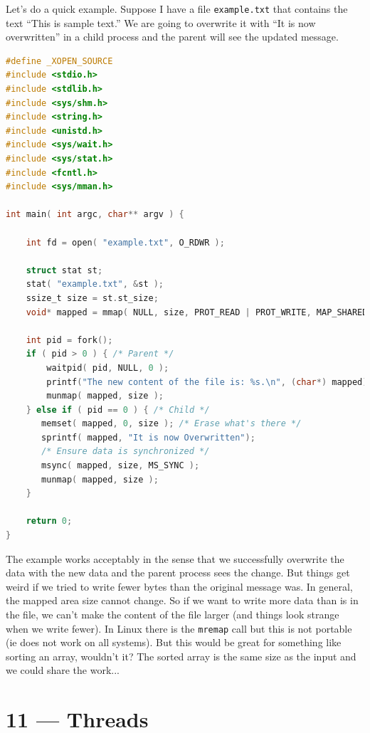 \documentclass[a4paper]{report}
\begin{document}
Let's do a quick example. Suppose I have a file \texttt{example.txt} that contains the text ``This is sample text.'' We are going to overwrite it with ``It is now overwritten'' in a child process and the parent will see the updated message.

\begin{lstlisting}[language=C]
#define _XOPEN_SOURCE
#include <stdio.h>
#include <stdlib.h>
#include <sys/shm.h>
#include <string.h>
#include <unistd.h>
#include <sys/wait.h>
#include <sys/stat.h>
#include <fcntl.h>
#include <sys/mman.h>

int main( int argc, char** argv ) { 

    int fd = open( "example.txt", O_RDWR );
    
    struct stat st; 
    stat( "example.txt", &st );
    ssize_t size = st.st_size;
    void* mapped = mmap( NULL, size, PROT_READ | PROT_WRITE, MAP_SHARED, fd, 0 );  
    
    int pid = fork();
    if ( pid > 0 ) { /* Parent */
        waitpid( pid, NULL, 0 );
        printf("The new content of the file is: %s.\n", (char*) mapped);
        munmap( mapped, size );
    } else if ( pid == 0 ) { /* Child */
       memset( mapped, 0, size ); /* Erase what's there */
       sprintf( mapped, "It is now Overwritten");
       /* Ensure data is synchronized */
       msync( mapped, size, MS_SYNC );
       munmap( mapped, size );
    }

    return 0;
}
\end{lstlisting}

The example works acceptably in the sense that we successfully overwrite the data with the new data and the parent process sees the change. But things get weird if we tried to write fewer bytes than the original message was. In general, the mapped area size cannot change. So if we want to write more data than is in the file, we can't make the content of the file larger (and things look strange when we write fewer). In Linux there is the \texttt{mremap} call but this is not portable (ie does not work on all systems). But this would be great for something like sorting an array, wouldn't it? The sorted array is the same size as the input and we could share the work...








\chapter*{11 --- Threads}
\end{document}
